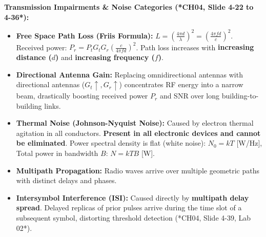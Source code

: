 \documentclass[10pt,a4paper]{article}
\begin{document}
\vspace{1pt}

\noindent\textbf{\color{themeblue}Transmission Impairments \& Noise Categories (*CH04, Slide 4-22 to 4-36*):}
\begin{itemize}[leftmargin=12pt, itemsep=1.5pt, topsep=1pt]
    \item \textbf{Free Space Path Loss (Friis Formula):} $L = \left(\frac{4\pi d}{\lambda}\right)^2 = \left(\frac{4\pi f d}{c}\right)^2$. Received power: $P_r = P_t G_t G_r \left(\frac{c}{4\pi f d}\right)^2$. Path loss increases with \textbf{increasing distance ($d$)} and \textbf{increasing frequency ($f$)}.
    \item \textbf{Directional Antenna Gain:} Replacing omnidirectional antennas with directional antennas ($G_t \uparrow, G_r \uparrow$) concentrates RF energy into a narrow beam, drastically boosting received power $P_r$ and SNR over long building-to-building links.
    \item \textbf{Thermal Noise (Johnson-Nyquist Noise):} Caused by electron thermal agitation in all conductors. \textbf{Present in all electronic devices and cannot be eliminated}. Power spectral density is flat (white noise): $N_0 = kT$ [W/Hz], Total power in bandwidth $B$: $N = kTB$ [W].
    \item \textbf{Multipath Propagation:} Radio waves arrive over multiple geometric paths with distinct delays and phases.
    \item \textbf{Intersymbol Interference (ISI):} Caused directly by \textbf{multipath delay spread}. Delayed replicas of prior pulses arrive during the time slot of a subsequent symbol, distorting threshold detection (*CH04, Slide 4-39, Lab 02*).
\end{itemize}

\vspace{1pt}
\end{document}
